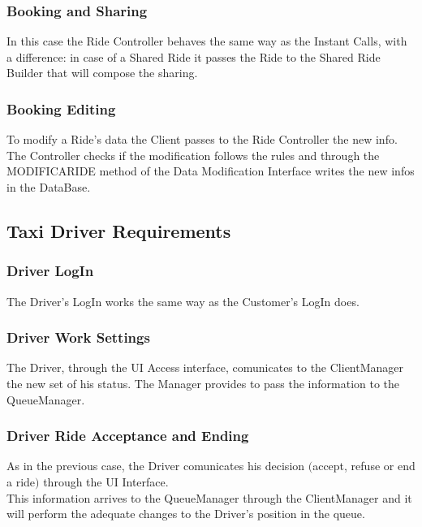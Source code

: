 		\subsubsection{Booking and Sharing}
		In this case the Ride Controller behaves the same way as the Instant Calls, with a difference: in case of a Shared Ride it passes the Ride to the Shared Ride Builder that will compose the sharing.
		
		\subsubsection{Booking Editing}
		To modify a Ride's data the Client passes to the Ride Controller the new info. The Controller checks if the modification follows the rules and through the MODIFICARIDE method of the Data Modification Interface writes the new infos in the DataBase.
		
		
	\subsection {Taxi Driver Requirements}
	
		\subsubsection{Driver LogIn}
		The Driver's LogIn works the same way as the Customer's LogIn does.
		
		\subsubsection{Driver Work Settings}
		The Driver, through the UI Access interface, comunicates to the ClientManager the new set of his status. The Manager provides to pass the information to the QueueManager.
		
		\subsubsection{Driver Ride Acceptance and Ending}
		As in the previous case, the Driver comunicates his decision $($accept, refuse or end a ride$)$ through the UI Interface. \\ This information arrives to the QueueManager through the ClientManager and it will perform the adequate changes to the Driver's position in the queue.
